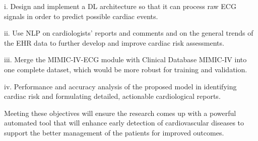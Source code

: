 i. Design and implement a DL architecture so that it can process raw ECG signals in order to predict possible cardiac events. 

ii. Use NLP on cardiologists' reports and comments and on the general trends of the EHR data to further develop and improve cardiac risk assessments.

iii. Merge the MIMIC-IV-ECG module with Clinical Database MIMIC-IV into one complete dataset, which would be more robust for training and validation.

iv. Performance and accuracy analysis of the proposed model in identifying cardiac risk and formulating detailed, actionable cardiological reports.


Meeting these objectives will ensure the research comes up with a powerful automated tool that will enhance early detection of cardiovascular diseases to support the better management of the patients for improved outcomes.
